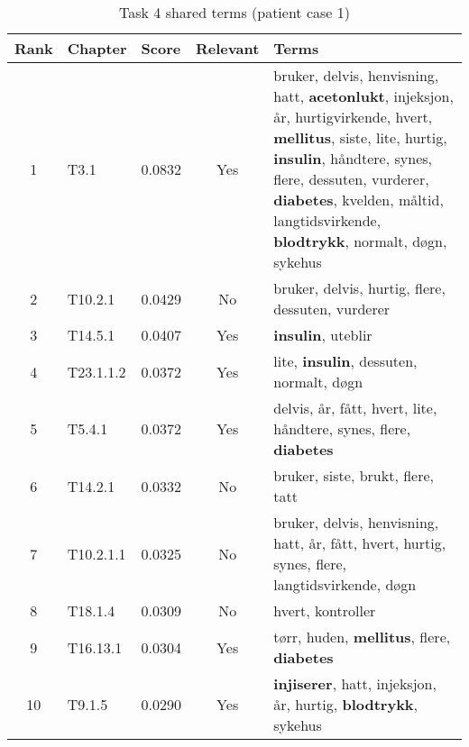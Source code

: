 \begin{table}[htbp] \footnotesize \center
\caption{Task 4 shared terms (patient case 1)\label{tab:terms}}
\begin{tabularx}{\textwidth}{c l l c X}
    \toprule
    Rank & Chapter & Score & Relevant & Terms \\
    \midrule
	1 & T3.1 & 0.0832 & Yes & bruker, delvis, henvisning, hatt, \textbf{acetonlukt}, injeksjon, år, hurtigvirkende, hvert, \textbf{mellitus}, siste, lite, hurtig, \textbf{insulin}, håndtere, synes, flere, dessuten, vurderer, \textbf{diabetes}, kvelden, måltid, langtidsvirkende, \textbf{blodtrykk}, normalt, døgn, sykehus \\
	2 & T10.2.1 & 0.0429 & No & bruker, delvis, hurtig, flere, dessuten, vurderer \\
	3 & T14.5.1 & 0.0407 & Yes & \textbf{insulin}, uteblir \\
	4 & T23.1.1.2 & 0.0372 & Yes & lite, \textbf{insulin}, dessuten, normalt, døgn \\
	5 & T5.4.1 & 0.0372 & Yes & delvis, år, fått, hvert, lite, håndtere, synes, flere, \textbf{diabetes} \\
	6 & T14.2.1 & 0.0332 & No & bruker, siste, brukt, flere, tatt \\
	7 & T10.2.1.1 & 0.0325 & No & bruker, delvis, henvisning, hatt, år, fått, hvert, hurtig, synes, flere, langtidsvirkende, døgn \\
	8 & T18.1.4 & 0.0309 & No & hvert, kontroller \\
	9 & T16.13.1 & 0.0304 & Yes & tørr, huden, \textbf{mellitus}, flere, \textbf{diabetes} \\
	10 & T9.1.5 & 0.0290 & Yes & \textbf{injiserer}, hatt, injeksjon, år, hurtig, \textbf{blodtrykk}, sykehus \\
	\bottomrule
\end{tabularx}
\end{table}

